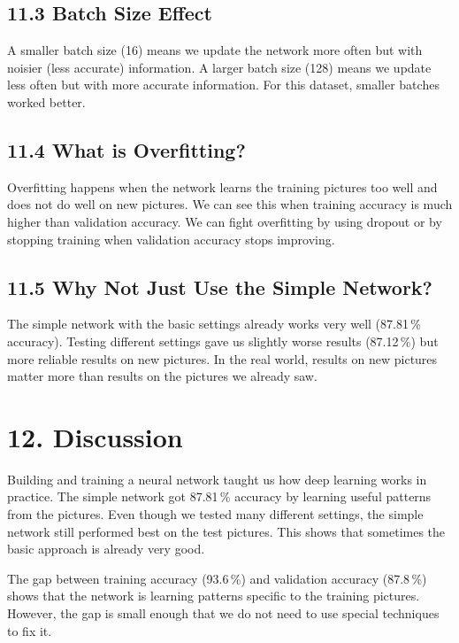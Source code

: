\documentclass[11pt]{article}
\begin{document}
\subsection*{11.3 Batch Size Effect}

A smaller batch size (16) means we update the network more often but with noisier (less accurate) information. A larger batch size (128) means we update less often but with more accurate information. For this dataset, smaller batches worked better.

\subsection*{11.4 What is Overfitting?}

Overfitting happens when the network learns the training pictures too well and does not do well on new pictures. We can see this when training accuracy is much higher than validation accuracy. We can fight overfitting by using dropout or by stopping training when validation accuracy stops improving.

\subsection*{11.5 Why Not Just Use the Simple Network?}

The simple network with the basic settings already works very well (87.81\,\% accuracy). Testing different settings gave us slightly worse results (87.12\,\%) but more reliable results on new pictures. In the real world, results on new pictures matter more than results on the pictures we already saw.

\section*{12. Discussion}

Building and training a neural network taught us how deep learning works in practice. The simple network got 87.81\,\% accuracy by learning useful patterns from the pictures. Even though we tested many different settings, the simple network still performed best on the test pictures. This shows that sometimes the basic approach is already very good.

The gap between training accuracy (93.6\,\%) and validation accuracy (87.8\,\%) shows that the network is learning patterns specific to the training pictures. However, the gap is small enough that we do not need to use special techniques to fix it.
\end{document}
